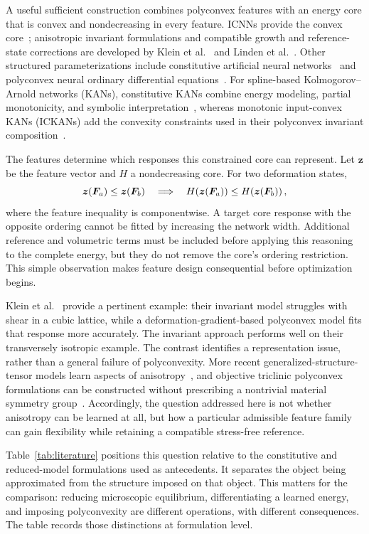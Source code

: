 A useful sufficient construction combines polyconvex features with an energy core that is convex and nondecreasing in every feature. ICNNs provide the convex core~\cite{amos2017}; anisotropic invariant formulations and compatible growth and reference-state corrections are developed by Klein et al.~\cite{klein2022} and Linden et al.~\cite{linden2023}. Other structured parameterizations include constitutive artificial neural networks~\cite{Linka2023} and polyconvex neural ordinary differential equations~\cite{Tac2022}. For spline-based Kolmogorov--Arnold networks (KANs), constitutive KANs combine energy modeling, partial monotonicity, and symbolic interpretation~\cite{Abdolazizi2025}, whereas monotonic input-convex KANs (ICKANs) add the convexity constraints used in their polyconvex invariant composition~\cite{thakolkaran2025}.

The features determine which responses this constrained core can represent. Let $\bm z$ be the feature vector and $H$ a nondecreasing core. For two deformation states,
\[
 \bm z(\bm F_a)\leq\bm z(\bm F_b)
 \quad\Longrightarrow\quad
 H\!\left(\bm z(\bm F_a)\right)\leq H\!\left(\bm z(\bm F_b)\right),
\]
where the feature inequality is componentwise. A target core response with the opposite ordering cannot be fitted by increasing the network width. Additional reference and volumetric terms must be included before applying this reasoning to the complete energy, but they do not remove the core's ordering restriction. This simple observation makes feature design consequential before optimization begins.

Klein et al.~\cite{klein2022} provide a pertinent example: their invariant model struggles with shear in a cubic lattice, while a deformation-gradient-based polyconvex model fits that response more accurately. The invariant approach performs well on their transversely isotropic example. The contrast identifies a representation issue, rather than a general failure of polyconvexity. More recent generalized-structure-tensor models learn aspects of anisotropy~\cite{Kalina2024}, and objective triclinic polyconvex formulations can be constructed without prescribing a nontrivial material symmetry group~\cite{klein2026}. Accordingly, the question addressed here is not whether anisotropy can be learned at all, but how a particular admissible feature family can gain flexibility while retaining a compatible stress-free reference.

Table~\ref{tab:literature} positions this question relative to the constitutive and reduced-model formulations used as antecedents. It separates the object being approximated from the structure imposed on that object. This matters for the comparison: reducing microscopic equilibrium, differentiating a learned energy, and imposing polyconvexity are different operations, with different consequences. The table records those distinctions at formulation level.


